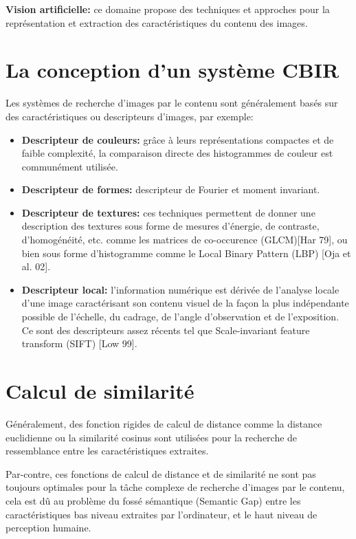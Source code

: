 \textbf{Vision artificielle:} ce domaine propose des techniques et approches pour la représentation et extraction des caractéristiques du contenu des images.


\section{La conception d'un système CBIR}

	Les systèmes de recherche d'images par le contenu sont généralement basés sur des caractéristiques ou descripteurs d'images, par exemple:
	
\begin{itemize}

\item \textbf{Descripteur  de couleurs:} grâce à leurs représentations compactes et de faible complexité, la comparaison directe des histogrammes de couleur est communément utilisée.
\item \textbf{Descripteur de formes:} descripteur de Fourier et moment invariant.
\item \textbf{Descripteur de textures:} ces techniques permettent de donner une description des textures sous forme de mesures d'énergie, de contraste, d'homogénéité, etc. comme les matrices de co-occurence (GLCM)[Har 79], ou bien sous forme d'histogramme comme le Local Binary Pattern (LBP) [Oja et al. 02].
\item \textbf{Descripteur local:}  l'information numérique est dérivée de l'analyse locale d'une image caractérisant son contenu visuel de la façon la plus indépendante possible de l'échelle, du cadrage, de l'angle d'observation et de l'exposition. Ce sont des descripteurs assez récents tel que Scale-invariant feature transform (SIFT) [Low 99].

\end{itemize}

\section{Calcul de similarité}

	Généralement, des fonction rigides de calcul de distance comme la distance euclidienne ou la similarité cosinus sont utilisées pour la recherche de ressemblance entre les caractéristiques extraites.

	Par-contre, ces fonctions de calcul de distance et de similarité ne sont pas toujours optimales pour la tâche complexe de recherche d'images par le contenu, cela est dû au problème du fossé sémantique (Semantic Gap) entre les caractéristiques bas niveau extraites par l'ordinateur, et le haut niveau de perception humaine.

